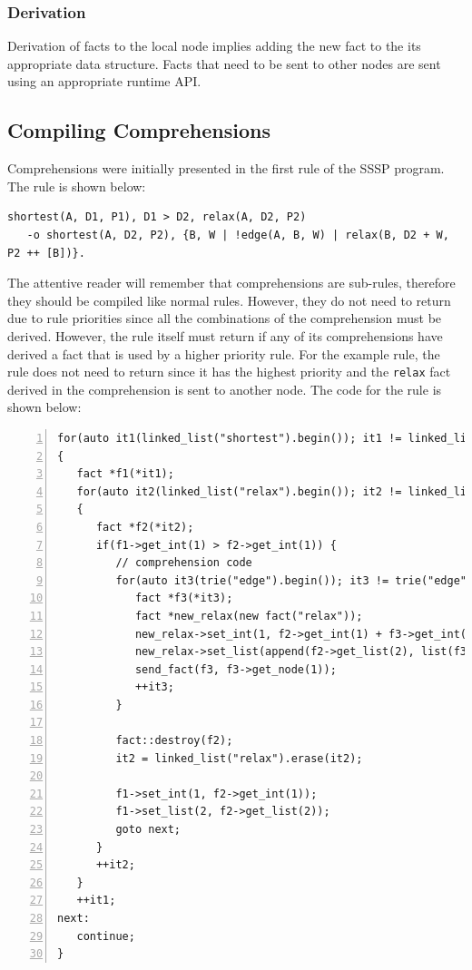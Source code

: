 \subsubsection{Derivation}
Derivation of facts to the local node implies adding the new fact to the its
appropriate data structure. Facts that need to be sent to other nodes are sent
using an appropriate runtime API.


\subsection{Compiling Comprehensions}

Comprehensions were initially presented in the first rule of the SSSP program.
The rule is shown below:

\begin{Verbatim}[fontsize=\scriptsize]
shortest(A, D1, P1), D1 > D2, relax(A, D2, P2)
   -o shortest(A, D2, P2), {B, W | !edge(A, B, W) | relax(B, D2 + W, P2 ++ [B])}.
\end{Verbatim}

The attentive reader will remember that comprehensions are sub-rules, therefore
they should be compiled like normal rules. However, they do not need to return
due to rule priorities since all the combinations of the comprehension must be
derived. However, the rule itself must return if any of its comprehensions
have derived a fact that is used by a higher priority rule. For the example
rule, the rule does not need to return since it has the highest priority and the
\texttt{relax} fact derived in the comprehension is sent to another node.
The code for the rule is shown below:

\begin{Verbatim}[numbers=left,fontsize=\scriptsize]
for(auto it1(linked_list("shortest").begin()); it1 != linked_list("shortest").end(); )
{
   fact *f1(*it1);
   for(auto it2(linked_list("relax").begin()); it2 != linked_list("relax").end(); )
   {
      fact *f2(*it2);
      if(f1->get_int(1) > f2->get_int(1)) {
         // comprehension code
         for(auto it3(trie("edge").begin()); it3 != trie("edge").end(); ) {
            fact *f3(*it3);
            fact *new_relax(new fact("relax"));
            new_relax->set_int(1, f2->get_int(1) + f3->get_int(2));
            new_relax->set_list(append(f2->get_list(2), list(f3->get_node(1))));
            send_fact(f3, f3->get_node(1));
            ++it3;
         }

         fact::destroy(f2);
         it2 = linked_list("relax").erase(it2);

         f1->set_int(1, f2->get_int(1));
         f1->set_list(2, f2->get_list(2));
         goto next;
      }
      ++it2;
   }
   ++it1;
next:
   continue;
}
\end{Verbatim}

